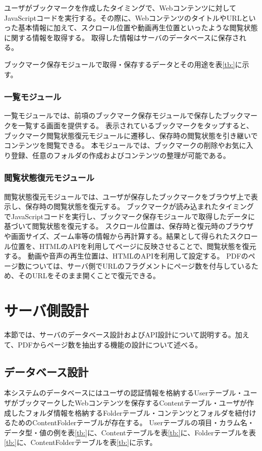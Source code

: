 ユーザがブックマークを作成したタイミングで、Webコンテンツに対してJavaScriptコードを実行する。その際に、WebコンテンツのタイトルやURLといった基本情報に加えて、スクロール位置や動画再生位置といったような閲覧状態に関する情報を取得する。
取得した情報はサーバのデータベースに保存される。

ブックマーク保存モジュールで取得・保存するデータとその用途を表\ref{tb:}に示す。

\subsubsection{一覧モジュール}
一覧モジュールでは、前項のブックマーク保存モジュールで保存したブックマークを一覧する画面を提供する。
表示されているブックマークをタップすると、ブックマーク閲覧状態復元モジュールに遷移し、保存時の閲覧状態を引き継いでコンテンツを閲覧できる。
本モジュールでは、ブックマークの削除やお気に入り登録、任意のフォルダの作成およびコンテンツの整理が可能である。

\subsubsection{閲覧状態復元モジュール}
閲覧状態復元モジュールでは、ユーザが保存したブックマークをブラウザ上で表示し、保存時の閲覧状態を復元する。
ブックマークが読み込まれたタイミングでJavaScriptコードを実行し、ブックマーク保存モジュールで取得したデータに基づいて閲覧状態を復元する。
スクロール位置は、保存時と復元時のブラウザや画面サイズ、ズーム率等の情報から再計算する。結果として得られたスクロール位置を、HTMLのAPIを利用してページに反映させることで、閲覧状態を復元する。
動画や音声の再生位置は、HTMLのAPIを利用して設定する。
PDFのページ数については、サーバ側でURLのフラグメントにページ数を付与しているため、そのURLをそのまま開くことで復元できる。

\section{サーバ側設計}
本節では、サーバのデータベース設計およびAPI設計について説明する。加えて、PDFからページ数を抽出する機能の設計について述べる。

\subsection{データベース設計}
本システムのデータベースにはユーザの認証情報を格納するUserテーブル・ユーザがブックマークしたWebコンテンツを保存するContentテーブル・ユーザが作成したフォルダ情報を格納するFolderテーブル・コンテンツとフォルダを紐付けるためのContentFolderテーブルが存在する。
Userテーブルの項目・カラム名・データ型・値の例を表\ref{tb:}に、Contentテーブルを表\ref{tb:}に、Folderテーブルを表\ref{tb:}に、ContentFolderテーブルを表\ref{tb:}に示す。

